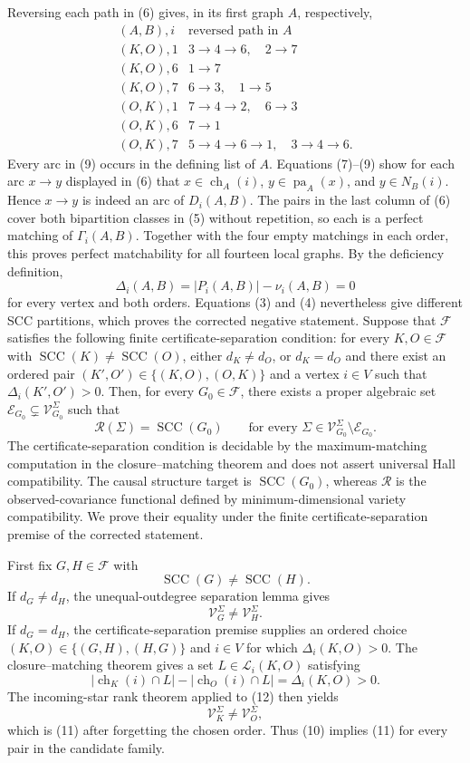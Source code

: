 Reversing each path in (6) gives, in its first graph \(A\), respectively,
\[
\begin{array}{c|c}
(A,B),i&\text{reversed path in }A\\ \hline
(K,O),1&3\to4\to6,\quad 2\to7\\
(K,O),6&1\to7\\
(K,O),7&6\to3,\quad 1\to5\\
(O,K),1&7\to4\to2,\quad 6\to3\\
(O,K),6&7\to1\\
(O,K),7&5\to4\to6\to1,\quad 3\to4\to6.
\end{array}
\tag{9}
\]
Every arc in (9) occurs in the defining list of \(A\).  Equations (7)--(9) show for each arc \(x\to y\) displayed in (6) that \(x\in\operatorname{ch}_A(i)\), \(y\in\operatorname{pa}_A(x)\), and \(y\in N_B(i)\).  Hence \(x\to y\) is indeed an arc of \(D_i(A,B)\).  The pairs in the last column of (6) cover both bipartition classes in (5) without repetition, so each is a perfect matching of \(\Gamma_i(A,B)\).  Together with the four empty matchings in each order, this proves perfect matchability for all fourteen local graphs.  By the deficiency definition,
\[
\Delta_i(A,B)=|P_i(A,B)|-\nu_i(A,B)=0
\]
for every vertex and both orders.  Equations (3) and (4) nevertheless give different SCC partitions, which proves the corrected negative statement.
Suppose that \(\mathcal F\) satisfies the following finite certificate-separation condition: for every \(K,O\in\mathcal F\) with \(\operatorname{SCC}(K)\ne\operatorname{SCC}(O)\), either \(d_K\ne d_O\), or \(d_K=d_O\) and there exist an ordered pair \((K',O')\in\{(K,O),(O,K)\}\) and a vertex \(i\in V\) such that \(\Delta_i(K',O')>0\).  Then, for every \(G_0\in\mathcal F\), there exists a proper algebraic set \(\mathcal E_{G_0}\subsetneq\mathcal V_{G_0}^\Sigma\) such that
\[
\mathcal R(\Sigma)=\operatorname{SCC}(G_0)
\qquad\text{for every }\Sigma\in\mathcal V_{G_0}^\Sigma\setminus\mathcal E_{G_0}.
\]
The certificate-separation condition is decidable by the maximum-matching computation in the closure--matching theorem and does not assert universal Hall compatibility.
The causal structure target is \(\operatorname{SCC}(G_0)\), whereas \(\mathcal R\) is the observed-covariance functional defined by minimum-dimensional variety compatibility.  We prove their equality under the finite certificate-separation premise of the corrected statement.

First fix \(G,H\in\mathcal F\) with
\[
\operatorname{SCC}(G)\ne\operatorname{SCC}(H).
\tag{10}
\]
If \(d_G\ne d_H\), the unequal-outdegree separation lemma gives
\[
\mathcal V_G^\Sigma\ne\mathcal V_H^\Sigma.
\tag{11}
\]
If \(d_G=d_H\), the certificate-separation premise supplies an ordered choice \((K,O)\in\{(G,H),(H,G)\}\) and \(i\in V\) for which \(\Delta_i(K,O)>0\).  The closure--matching theorem gives a set \(L\in\mathcal L_i(K,O)\) satisfying
\[
|\operatorname{ch}_K(i)\cap L|-|\operatorname{ch}_O(i)\cap L|
=\Delta_i(K,O)>0.
\tag{12}
\]
The incoming-star rank theorem applied to (12) then yields
\[
\mathcal V_K^\Sigma\ne\mathcal V_O^\Sigma,
\]
which is (11) after forgetting the chosen order.  Thus (10) implies (11) for every pair in the candidate family.

